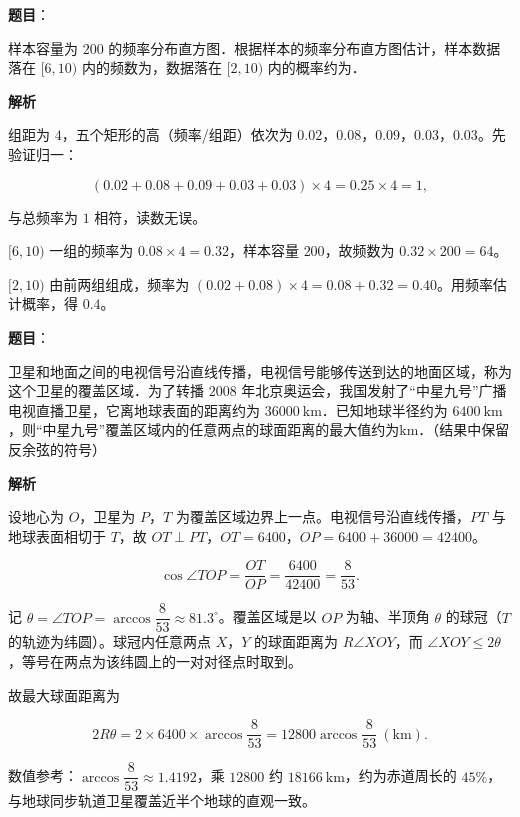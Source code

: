 \begin{answer}

\textbf{题目}：

样本容量为 $200$ 的频率分布直方图．根据样本的频率分布直方图估计，样本数据落在 $[6,10)$ 内的频数为\gkblank{}，数据落在 $[2,10)$ 内的概率约为\gkblank{}．
\nopagebreak[4]
\begin{center}\end{center}
\nopagebreak[4]
\textbf{解析}

组距为 $4$，五个矩形的高（频率/组距）依次为 $0.02$，$0.08$，$0.09$，$0.03$，$0.03$。先验证归一：

\nopagebreak[4]
\[(0.02+0.08+0.09+0.03+0.03)\times4=0.25\times4=1,\]

与总频率为 $1$ 相符，读数无误。

$[6,10)$ 一组的频率为 $0.08\times4=0.32$，样本容量 $200$，故频数为 $0.32\times200=64$。

$[2,10)$ 由前两组组成，频率为 $(0.02+0.08)\times4=0.08+0.32=0.40$。用频率估计概率，得 $0.4$。


\end{answer}
\begin{answer}

\textbf{题目}：

卫星和地面之间的电视信号沿直线传播，电视信号能够传送到达的地面区域，称为这个卫星的覆盖区域．为了转播 $2008$ 年北京奥运会，我国发射了“中星九号”广播电视直播卫星，它离地球表面的距离约为 $36000\ \mathrm{km}$．已知地球半径约为 $6400\ \mathrm{km}$，则“中星九号”覆盖区域内的任意两点的球面距离的最大值约为\gkblank{}$\mathrm{km}$．（结果中保留反余弦的符号）

\textbf{解析}

设地心为 $O$，卫星为 $P$，$T$ 为覆盖区域边界上一点。电视信号沿直线传播，$PT$ 与地球表面相切于 $T$，故 $OT\perp PT$，$OT=6400$，$OP=6400+36000=42400$。

\nopagebreak[4]
\[\cos\angle TOP=\frac{OT}{OP}=\frac{6400}{42400}=\frac{8}{53}.\]

记 $\theta=\angle TOP=\arccos\dfrac{8}{53}\approx81.3^\circ$。覆盖区域是以 $OP$ 为轴、半顶角 $\theta$ 的球冠（$T$ 的轨迹为纬圆）。球冠内任意两点 $X$，$Y$ 的球面距离为 $R\angle XOY$，而 $\angle XOY\leqslant2\theta$，等号在两点为该纬圆上的一对对径点时取到。

故最大球面距离为

\nopagebreak[4]
\[2R\theta=2\times6400\times\arccos\frac{8}{53}=12800\arccos\frac{8}{53}\ (\mathrm{km}).\]

数值参考：$\arccos\dfrac{8}{53}\approx1.4192$，乘 $12800$ 约 $18166\ \mathrm{km}$，约为赤道周长的 $45\%$，与地球同步轨道卫星覆盖近半个地球的直观一致。


\end{answer}
